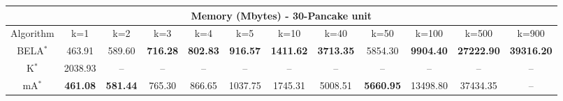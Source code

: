 \begin{tabular}{c|ccccccccccc}\toprule
\multicolumn{12}{c}{Memory (Mbytes) - 30-Pancake unit}\\ \midrule
Algorithm & k=1 & k=2 & k=3 & k=4 & k=5 & k=10 & k=40 & k=50 & k=100 & k=500 & k=900 \\ \midrule
BELA$^*$ & 463.91 & 589.60 & \textbf{716.28} & \textbf{802.83} & \textbf{916.57} & \textbf{1411.62} & \textbf{3713.35} & 5854.30 & \textbf{9904.40} & \textbf{27222.90} & \textbf{39316.20} \\
K$^*$ & 2038.93 & -- & -- & -- & -- & -- & -- & -- & -- & -- & -- \\
mA$^*$ & \textbf{461.08} & \textbf{581.44} & 765.30 & 866.65 & 1037.75 & 1745.31 & 5008.51 & \textbf{5660.95} & 13498.80 & 37434.35 & -- \\ \bottomrule 
\end{tabular}
